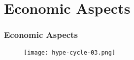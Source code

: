 \section{Economic Aspects}

\begin{frame}[allowframebreaks]
\frametitle{Economic Aspects}

\begin{center}
  \begin{figure}
    \texttt{[image: hype-cycle-03.png]}
  \end{figure}
\end{center}

\end{frame}
